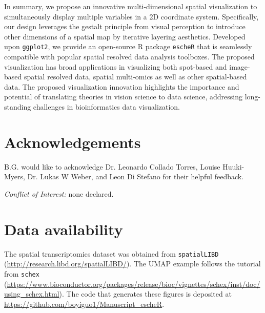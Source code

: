 \documentclass[11pt]{article}
\begin{document}
\vspace{0.45in}
In summary, we propose an innovative multi-dimensional spatial visualization to simultaneously display multiple variables in a 2D coordinate system. Specifically, our design leverages the gestalt principle from visual perception to introduce other dimensions of a spatial map by iterative layering aesthetics. Developed upon \texttt{ggplot2}, we provide an open-source R package \texttt{escheR} that is seamlessly compatible with popular spatial resolved data analysis toolboxes. The proposed visualization has broad applications in visualizing both spot-based and image-based spatial resolved data, spatial multi-omics as well as other spatial-based data. The proposed visualization innovation highlights the importance and potential of translating theories in vision science to data science, addressing long-standing challenges in bioinformatics data visualization.







\section*{Acknowledgements}
B.G. would like to acknowledge Dr. Leonardo Collado Torres, Louise Huuki-Myers, Dr. Lukas W Weber, and Leon Di Stefano for their helpful feedback.

\vspace{0.2in}
\noindent \textit{Conflict of Interest:} none declared.

\section*{Data availability}
The spatial transcriptomics dataset was obtained from \texttt{spatialLIBD} (\url{http://research.libd.org/spatialLIBD/}). The UMAP example follows the tutorial from \texttt{schex} (\url{https://www.bioconductor.org/packages/release/bioc/vignettes/schex/inst/doc/using_schex.html}). The code that generates these figures is deposited at \url{https://github.com/boyiguo1/Manuscript_escheR}.
\end{document}
